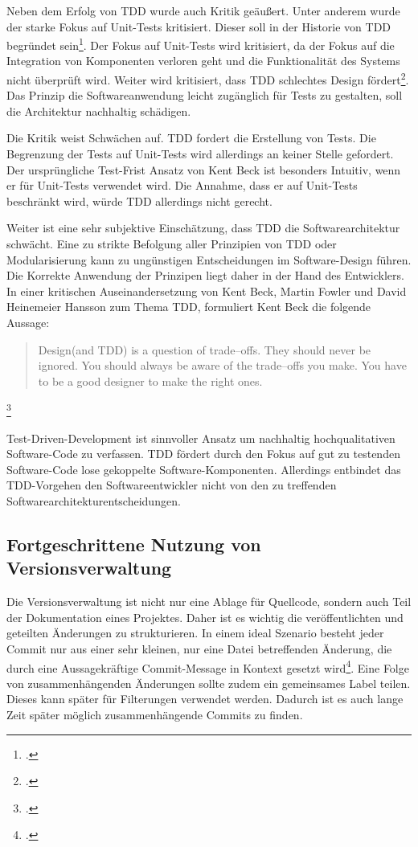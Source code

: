 Neben dem Erfolg von TDD wurde auch Kritik geäußert. Unter anderem wurde der starke Fokus auf Unit-Tests kritisiert. Dieser soll in der Historie von TDD begründet sein\footcite[vgl.][]{conciso-tdd-critique}. Der Fokus auf Unit-Tests wird kritisiert, da der Fokus auf die Integration von Komponenten verloren geht und die Funktionalität des Systems nicht überprüft wird. Weiter wird kritisiert, dass TDD schlechtes Design fördert\footcite[vgl.][]{hansson-tdd-is-dead}. Das Prinzip die Softwareanwendung leicht zugänglich für Tests zu gestalten, soll die Architektur nachhaltig schädigen.

Die Kritik weist Schwächen auf. TDD fordert die Erstellung von Tests. Die Begrenzung der Tests auf Unit-Tests wird allerdings an keiner Stelle gefordert. Der ursprüngliche Test-Frist Ansatz von Kent Beck ist besonders Intuitiv, wenn er für Unit-Tests verwendet wird. Die Annahme, dass er auf Unit-Tests beschränkt wird, würde TDD allerdings nicht gerecht. 

Weiter ist eine sehr subjektive Einschätzung, dass TDD die Softwarearchitektur schwächt. Eine zu strikte Befolgung aller Prinzipien von TDD oder Modularisierung kann zu ungünstigen Entscheidungen im Software-Design führen. Die Korrekte Anwendung der Prinzipen liegt daher in der Hand des Entwicklers. In einer kritischen Auseinandersetzung von Kent Beck, Martin Fowler und David Heinemeier Hansson zum Thema TDD, formuliert Kent Beck die folgende Aussage:

\blockquote {Design(and TDD) is a question of trade–offs. They should never be ignored. You should always be aware of the trade–offs you make. You have to be a good designer to make the right ones.}\footcite[vgl.][S. 36]{aalborg-tdd-15-years}

Test-Driven-Development ist sinnvoller Ansatz um nachhaltig hochqualitativen Software-Code zu verfassen. TDD fördert durch den Fokus auf gut zu testenden Software-Code lose gekoppelte Software-Komponenten. Allerdings entbindet das TDD-Vorgehen den Softwareentwickler nicht von den zu treffenden Softwarearchitekturentscheidungen.

\subsection{Fortgeschrittene Nutzung von Versionsverwaltung}

Die Versionsverwaltung ist nicht nur eine Ablage für Quellcode, sondern auch Teil der Dokumentation eines Projektes. Daher ist es wichtig die veröffentlichten und geteilten Änderungen zu strukturieren. In einem ideal Szenario besteht jeder Commit nur aus einer sehr kleinen, nur eine Datei betreffenden Änderung, die durch eine Aussagekräftige Commit-Message in Kontext gesetzt wird\footcite[vgl.][Kap. Making only one change per commit]{git-essentials-2017}. Eine Folge von zusammenhängenden Änderungen sollte zudem ein gemeinsames Label teilen. Dieses kann später für Filterungen verwendet werden. Dadurch ist es auch lange Zeit später möglich zusammenhängende Commits zu finden.

